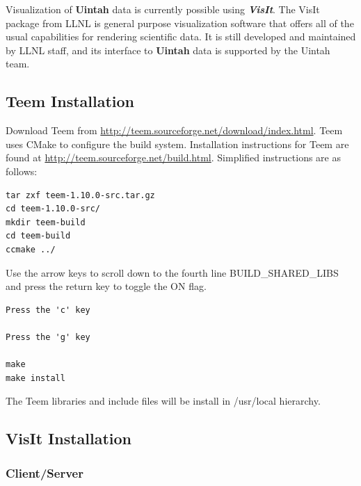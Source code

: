\documentclass[12pt]{article}
\begin{document}
Visualization of \textbf{Uintah} data is currently possible using
\textbf{\emph{VisIt}}. The VisIt package from LLNL is general purpose
visualization software that offers all of the usual capabilities for
rendering scientific data.  It is still developed and maintained by
LLNL staff, and its interface to \textbf{Uintah} data is supported by
the Uintah team.


\subsection{Teem Installation}
\label{subsec:teem}


Download Teem from
\url{http://teem.sourceforge.net/download/index.html}.  Teem uses
CMake to configure the build system. Installation instructions for
Teem are found at \url{http://teem.sourceforge.net/build.html}.  Simplified
instructions are as follows:

\begin{verbatim}
tar zxf teem-1.10.0-src.tar.gz
cd teem-1.10.0-src/
mkdir teem-build
cd teem-build
ccmake ../
\end{verbatim}

Use the arrow keys to scroll down to the fourth line
BUILD\_SHARED\_LIBS and press the return key to toggle the ON flag.

\begin{verbatim}
Press the 'c' key

Press the 'g' key

make
make install
\end{verbatim}
The Teem libraries and include files will be install in /usr/local hierarchy.

\subsection{VisIt Installation}

\subsubsection{Client/Server}
\label{subsec:ClientServer}
\end{document}
